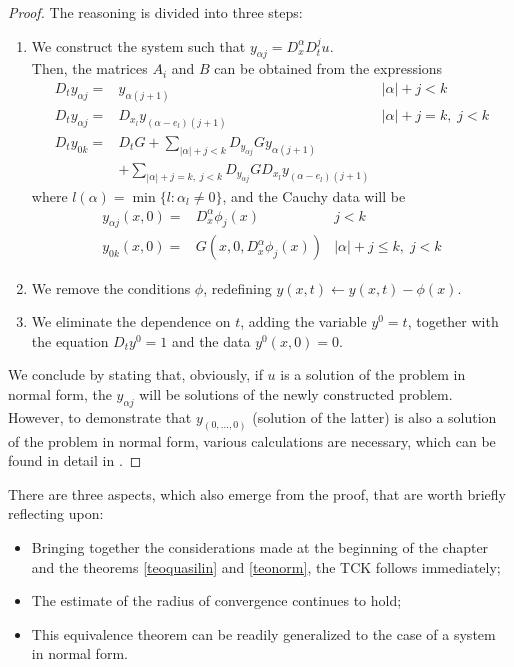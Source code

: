 \begin{proof}
The reasoning is divided into three steps:
\begin{enumerate}
\item We construct the system such that $y_{\alpha j}= D^\alpha_x D^j_t u$. \\ 
Then, the matrices $A_i$ and $B$ can be obtained from the expressions
\begin{align*}
D_t y_{\alpha j} =& y_{\alpha (j+1)} & |\alpha| + j < k \\ 
D_t y_{\alpha j} =& D_{x_l} y_{(\alpha-e_l)(j+1)} & |\alpha| + j = k, \; j < k \\ 
D_t y_{0k} =& D_tG + \sum_{|\alpha|+j < k} D_{y_{\alpha j}}G y_{\alpha (j+1)} \\ 
& + \sum_{|\alpha|+j = k, \; j < k} D_{y_{\alpha j}} G D_{x_l} y_{(\alpha-e_l)(j+1)}
\end{align*}
where $l(\alpha)=\min\{ l:\alpha_l\neq 0 \}$, and the Cauchy data will be
\begin{align*}
y_{\alpha j}(x, 0) = & D_x^{\alpha} \phi_j(x) & j < k \\ 
y_{0k}(x, 0) = & G\left( x, 0, D_x^{\alpha} \phi_j(x) \right) & \lvert \alpha \rvert + j \leq k, \; j < k 
\end{align*}
\item We remove the conditions $\phi$, redefining $y(x,t)\leftarrow y(x,t)-\phi (x)$.
\item We eliminate the dependence on $t$, adding the variable $y^0=t$, together with the equation $D_t y^0=1$ and the data $y^0(x,0)=0$.
\end{enumerate}
We conclude by stating that, obviously, if $u$ is a solution of the problem in normal form, the $y_{\alpha j}$ will be solutions of the newly constructed problem. However, to demonstrate that $y_{(0,\ldots,0)}$ (solution of the latter) is also a solution of the problem in normal form, various calculations are necessary, which can be found in detail in \cite[cap.1]{Folland}.
\end{proof}

\begin{remark}
There are three aspects, which also emerge from the proof, that are worth briefly reflecting upon:
\begin{itemize}
\item Bringing together the considerations made at the beginning of the chapter and the theorems \ref{teoquasilin} and \ref{teonorm}, the TCK follows immediately;
\item The estimate of the radius of convergence continues to hold;
\item This equivalence theorem can be readily generalized to the case of a system in normal form.
\end{itemize}
\end{remark}
